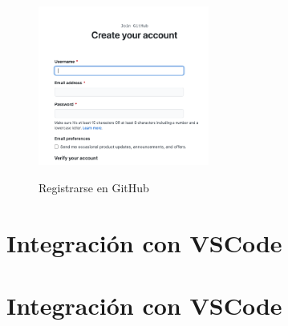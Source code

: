 \documentclass[11pt, oneside]{article}
\begin{document}
\begin{figure}[H]
  \centering
  \caption{Registrarse en GitHub}
  \includegraphics[width=0.50\textwidth]{./img/github-signup-2.png}
  \label{fig:github-signup-2}
\end{figure}

\section{Integración con VSCode}

\section{Integración con VSCode}
\end{document}
